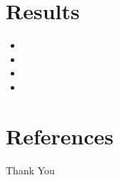 \documentclass{beamer}
\begin{document}
\section{Results}
\begin{frame}
    \begin{itemize}
        \item \lipsum[4][1-4]
        \item \lipsum[4][5-9]
        \item \lipsum[5][1-4]
        \item \lipsum[5][5-8]
    \end{itemize}
\end{frame}

 \section{References}

\begin{frame}[allowframebreaks]
    
    
    \nocite{*} %
\end{frame}


\begin{frame}
    \begin{center}
        {\Huge\calligra Thank You}
    \end{center}
\end{frame}
\end{document}
